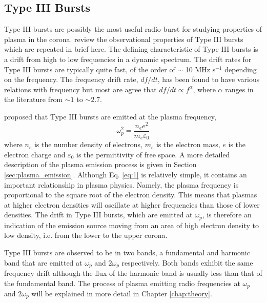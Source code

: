 \subsection{Type III Bursts}
\label{characteristics} 
Type III bursts are possibly the most useful radio burst for studying properties of plasma in the corona.
\cite{Reid2014} review the observational properties of Type III bursts which are repeated in brief here. The defining characteristic of Type III bursts is a drift from high to low frequencies in a dynamic spectrum. The drift rates for Type III bursts are typically quite fast, of the order of $\sim$ 10 MHz s$^{-1}$ depending on the frequency. The frequency drift rate, $df/dt$, has been found to have various relations with frequency \citep{Reid2014} but most are agree that $df/dt \propto f^{\alpha}$, where $\alpha$ ranges in the literature from $\sim 1$ to $\sim 2.7$. 

\cite{Ginzburg1958} proposed that Type III bursts are emitted at the plasma frequency,
\begin{equation}\label{eq:1}
    \omega_{p}^2 = \frac{n_e e^2}{m_e \varepsilon_0}
\end{equation}
where $n_e$ is the number density of electrons, $m_e$ is the electron mass, $e$ is the electron charge and $\varepsilon_0$ is the permittivity of free space. A more detailed description of the plasma emission process is given in Section \ref{sec:plasma_emission}.
Although Eq. \ref{eq:1} is relatively simple, it contains an important relationship in plasma physics. Namely, the plasma frequency is proportional to the square root of the electron density. This means that plasmas at higher electron densities will oscillate at higher frequencies than those of lower densities. The drift in Type III bursts, which are emitted at $\omega_p$, is therefore an indication of the emission source moving from an area of high electron density to low density, i.e. from the lower to the upper corona.

Type III bursts are observed to be in two bands, a fundamental and harmonic band that are emitted at $\omega_p$ and $2 \omega_p$ respectively. Both bands exhibit the same frequency drift although the flux of the harmonic band is usually less than that of the fundamental band. The process of plasma emitting radio frequencies at $\omega_p$ and $2 \omega_p$ will be explained in more detail in Chapter \ref{chap:theory}. 


